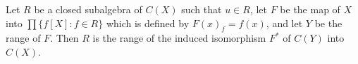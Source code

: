 Let $R$ be a closed subalgebra of $C(X)$ such that $u \in R$, let $F$ be the map of $X$ into $\prod \{f[X] : f \in R\}$ which is defined by $F(x)_f = f(x)$, and let $Y$ be the range of $F$. Then $R$ is the range of the induced isomorphism $F^*$ of $C(Y)$ into $C(X)$.
